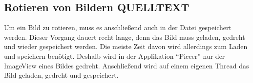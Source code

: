 \subsection{Rotieren von Bildern QUELLTEXT}
Um ein Bild zu rotieren, muss es anschließend auch in der Datei gespeichert werden.
Dieser Vorgang dauert recht lange, denn das Bild muss geladen, gedreht und wieder gespeichert werden.
Die meiste Zeit davon wird allerdings zum Laden und speichern benötigt.
Deshalb wird in der Applikation \enquote{Piccer} nur der ImageView eines Bildes gedreht.
Anschließend wird auf einem eigenen Thread das Bild geladen, gedreht und gespeichert.

